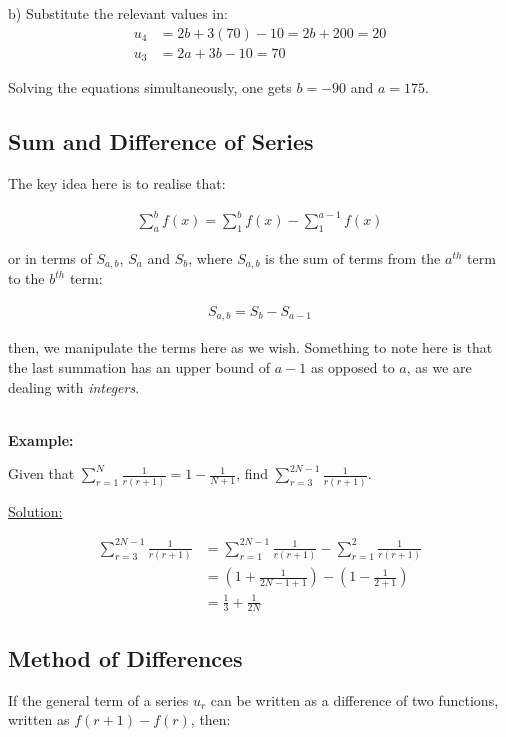 \documentclass[12pt, a4paper, titlepage]{article}
\begin{document}
b) Substitute the relevant values in:
\begin{align*}
    u_4 &= 2b + 3(70) - 10 = 2b + 200 = 20 \\
    u_3 &= 2a + 3b - 10 = 70
\end{align*}

Solving the equations simultaneously, one gets $b = -90$ and $a = 175$.

\subsection{Sum and Difference of Series}

The key idea here is to realise that:

\begin{align*}
    \sum_a^b f(x) = \sum_1^b f(x) - \sum_1^{a-1} f(x)
\end{align*}

or in terms of $S_{a,b}$, $S_a$ and $S_b$, where $S_{a, b}$ is the sum of terms from the $a^{th}$ term to the $b^{th}$ term:

\begin{align*}
    S_{a, b} = S_b - S_{a - 1}
\end{align*}

then, we manipulate the terms here as we wish. Something to note here is that the last summation has an upper bound of $a - 1$ as opposed to $a$, as we are dealing with \emph{integers}.

\textbf{\\ Example:}

Given that $\sum_{r = 1}^N \frac{1}{r(r+1)} = 1 - \frac{1}{N+1}$, find $\sum_{r = 3}^{2N-1} \frac{1}{r(r+1)}$.

\underline{Solution:}

\begin{align*}
    \sum_{r = 3}^{2N-1} \frac{1}{r(r+1)} &= \sum_{r = 1}^{2N-1} \frac{1}{r(r+1)} - \sum_{r = 1}^{2} \frac{1}{r(r+1)} \\
    &= (1 + \frac{1}{2N - 1 + 1}) - (1 - \frac{1}{2 + 1}) \\
    &= \frac{1}{3} + \frac{1}{2N}
\end{align*}

\subsection{Method of Differences}

If the general term of a series $u_r$ can be written as a difference of two functions, written as $f(r + 1) - f(r)$, then:
\end{document}
